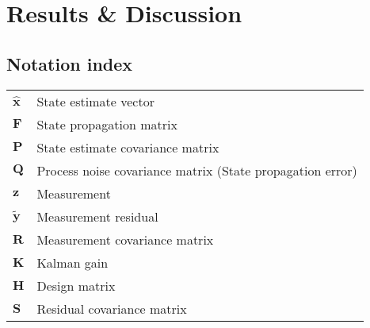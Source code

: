 \documentclass[12pt]{article}
\begin{document}
\section{Results \& Discussion}

\newpage
\begin{appendices}

\section{Notation index}
\begin{tabular}{ll}
$\hat{\mathbf{x}}$   & State estimate vector \\
$\mathbf{F}$         & State propagation matrix \\
$\mathbf{P}$         & State estimate covariance matrix \\
$\mathbf{Q}$         & Process noise covariance matrix (State propagation error) \\
$\mathbf{z}$         & Measurement \\
$\tilde{\mathbf{y}}$ & Measurement residual \\
$\mathbf{R}$         & Measurement covariance matrix \\
$\mathbf{K}$         & Kalman gain \\
$\mathbf{H}$         & Design matrix \\
$\mathbf{S}$         & Residual covariance matrix \\
\end{tabular}

\end{appendices}
\end{document}
